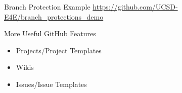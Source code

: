 \documentclass[aspectratio=169]{beamer}
\begin{document}
\begin{frame}{Branch Protection Example}
    \url{https://github.com/UCSD-E4E/branch_protections_demo}
\end{frame}
\begin{frame}{More Useful GitHub Features}
    \begin{itemize}
        \item Projects/Project Templates
        \item Wikis
        \item Issues/Issue Templates
    \end{itemize}
\end{frame}
\end{document}
